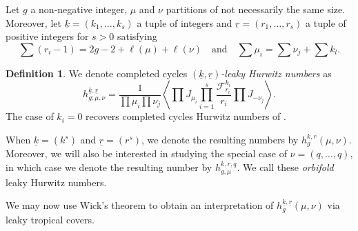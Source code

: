 \documentclass[10pt,a4paper,oneside,no-math,reqno]{amsart}%
\theoremstyle{plain}
\theoremstyle{definition}
\newtheorem{definition}[theorem]{Definition}
\theoremstyle{remark}
\numberwithin{equation}{section}
\newcommand{\1}{\mathds{1}}
\newcommand{\<}{\langle}
\renewcommand{\>}{\rangle}
\begin{document}
    Let $g$ a non-negative integer, $\mu$ and $\nu$ partitions of not necessarily the same size. Moreover, let $\underline{k}=(k_1,\dots,k_s)$ a tuple of integers and $\underline{r}=(r_1,\dots,r_s)$ a tuple of positive integers for $s>0$ satisfying
    \begin{equation}
        \sum (r_i-1)
        =
        2g-2+\ell(\mu)+\ell(\nu)
        \quad
        \text{and}
        \quad
        \sum \mu_i
        =
        \sum\nu_j+\sum k_l.
    \end{equation}

\begin{definition}
    We denote completed cycles $(\underline{k},\underline{r})$\emph{-leaky Hurwitz numbers} as
    \begin{equation}
    \label{def-leaky}
        h^{\underline{k},\underline{r}}_{g;\mu,\nu}
        =
        \frac{1}{\prod\mu_i\prod\nu_j} \left\langle \prod J_{\mu_i} \prod_{i=1}^s \frac{\mathcal{F}_{r_i}^{k_i}}{r_i} \prod J_{-\nu_j} \right\rangle.
    \end{equation}
    The case of $k_i=0$ recovers completed cycles Hurwitz numbers of \cite{OP06a}.
  
    When $\underline{k}=(k^s)$ and $\underline{r}=(r^s)$, we denote the resulting numbers by  $h_g^{k,r}(\mu,\nu)$. Moreover, we will also be interested in studying the special case of $\nu=(q,\dots,q)$, in which case we denote the resulting number by $h^{k,r,q}_{g,\mu}$. We call these \emph{orbifold} leaky Hurwitz numbers.
\end{definition}
    

  

    We may now use Wick's theorem to obtain an interpretation of $h_g^{\underline{k},\underline{r}}(\mu,\nu)$ via leaky tropical covers.
\end{document}
